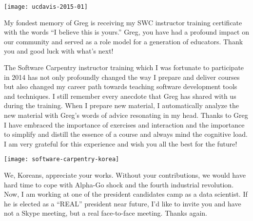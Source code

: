 \texttt{[image: ucdavis-2015-01]}

My fondest memory of Greg is receiving my SWC instructor training certificate
with the words ``I believe this is yours.'' Greg, you have had a profound
impact on our community and served as a role model for a generation of
educators.  Thank you and good luck with what's next!



The Software Carpentry instructor training which I was fortunate to participate
in 2014 has not only profoundly changed the way I prepare and deliver courses
but also changed my career path towards teaching software development tools and
techniques. I still remember every anecdote that Greg has shared with us during
the training. When I prepare new material, I automatically analyze the new
material with Greg's words of advice resonating in my head. Thanks to Greg I
have embraced the importance of exercises and interaction and the importance to
simplify and distill the essence of a course and always mind the cognitive
load. I am very grateful for this experience and wish you all the best for the
future!

\vspace*{\fill}

\newpage
\vspace*{0.6in}
\texttt{[image: software-carpentry-korea]}

We, Koreans, appreciate your works. Without your contributions, we would have
hard time to cope with Alpha-Go shock and the fourth industrial revolution.
Now, I am working at one of the president candidates camp as a data scientist.
If he is elected as a ``REAL'' president near future, I'd like to invite you
and have not a Skype meeting, but a real face-to-face meeting. Thanks again. 

\newpage

